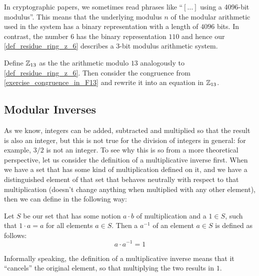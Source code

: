 \begin{remark} In cryptographic papers, we sometimes read phrases like ``$[\ldots]$ using a 4096-bit modulus''. This means that the underlying modulus $n$ of the modular arithmetic used in the system has a binary representation with a length of $4096$ bits. In contrast, the number $6$ has the binary representation $110$ and hence our \examplename{} \ref{def_residue_ring_z_6}
 describes a $3$-bit modulus arithmetic system.
\end{remark}
\begin{exercise}
Define $\mathbb{Z}_{13}$ as the the arithmetic modulo $13$ analogously to \examplename{} \ref{def_residue_ring_z_6}. Then consider the congruence from \exercisename{} \ref{exercise_congruence_in_F13} and rewrite it into an equation in $\mathbb{Z}_{13}$.
\end{exercise}

\subsection{Modular Inverses}
\label{sec:modular_inverses}
As we know, integers can be added, subtracted and multiplied so that the result is also an integer, but this is not true for the division of integers in general: for example, $3/2$ is not an integer. To see why this is so from a more theoretical perspective, let us consider the definition of a multiplicative inverse first. When we have a set that has some kind of multiplication defined on it, and we have a distinguished element of that set that behaves neutrally with respect to that multiplication (doesn't change anything when multiplied with any other element), then we can define  in the following way:

\begin{definition}

Let $S$ be our set that has some notion $a\cdot b$ of multiplication and a  $1\in S$, such that $1\cdot a = a$ for all elements $a\in S$. Then a  $a^{-1}$ of an element $a\in S$ is defined as follows:
\begin{equation}
a\cdot a^{-1} = 1
\end{equation}
\end{definition}
Informally speaking, the definition of a multiplicative inverse means that it ``cancels'' the original element, so that multiplying the two results in $1$.

